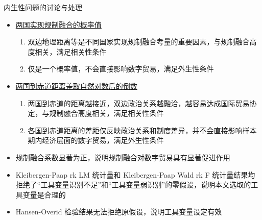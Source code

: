 \documentclass{beamer}
\begin{document}
\begin{frame}{内生性问题的讨论与处理}
    \begin{small}
        \begin{itemize}
            \item \uline{两国实现规制融合的概率值}
            \begin{enumerate}
                \item 双边地理距离等是不同国家实现规制融合考量的重要因素，与规制融合高度相关，满足相关性条件
                \item 仅是一个概率值，不会直接影响数字贸易，满足外生性条件
            \end{enumerate}
            \item \uline{两国到赤道距离差取自然对数后的倒数}
            \begin{enumerate}
                \item 两国到赤道的距离越接近，双边政治关系越融洽，越容易达成国际贸易协定，与规制融合高度相关，满足相关性条件
                \item 各国到赤道距离的差距仅反映政治关系和制度差异，并不会直接影响样本期内经济层面的数字贸易，满足外生性条件
            \end{enumerate}
        \end{itemize}
    \end{small}
    \begin{tcolorbox}[colback=lightyellow,colframe=deepblue,coltext=black]
        \scriptsize
        \begin{itemize}
            \item 规制融合系数显著为正，说明规制融合对数字贸易具有显著促进作用
            \item Kleibergen-Paap rk LM 统计量和 Kleibergen-Paap Wald rk F 统计量结果均拒绝了“工具变量识别不足”和“工具变量弱识别”的零假设，说明本文选取的工具变量是合理的
            \item Hansen-Overid 检验结果无法拒绝原假设，说明工具变量设定有效
        \end{itemize}
    \end{tcolorbox}
\end{frame}
\end{document}
